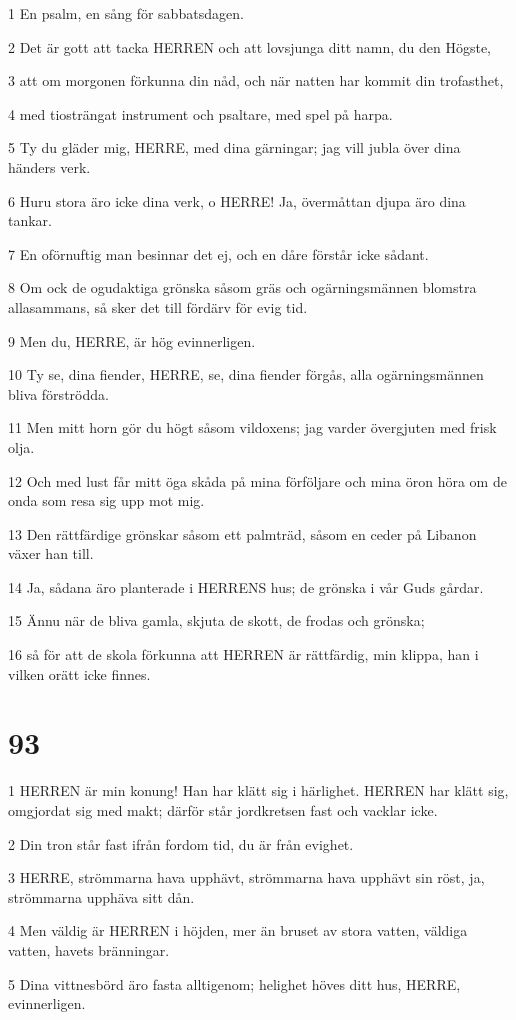 \par 1 En psalm, en sång för sabbatsdagen.
\par 2 Det är gott att tacka HERREN och att lovsjunga ditt namn, du den Högste,
\par 3 att om morgonen förkunna din nåd, och när natten har kommit din trofasthet,
\par 4 med tiosträngat instrument och psaltare, med spel på harpa.
\par 5 Ty du gläder mig, HERRE, med dina gärningar; jag vill jubla över dina händers verk.
\par 6 Huru stora äro icke dina verk, o HERRE! Ja, övermåttan djupa äro dina tankar.
\par 7 En oförnuftig man besinnar det ej, och en dåre förstår icke sådant.
\par 8 Om ock de ogudaktiga grönska såsom gräs och ogärningsmännen blomstra allasammans, så sker det till fördärv för evig tid.
\par 9 Men du, HERRE, är hög evinnerligen.
\par 10 Ty se, dina fiender, HERRE, se, dina fiender förgås, alla ogärningsmännen bliva förströdda.
\par 11 Men mitt horn gör du högt såsom vildoxens; jag varder övergjuten med frisk olja.
\par 12 Och med lust får mitt öga skåda på mina förföljare och mina öron höra om de onda som resa sig upp mot mig.
\par 13 Den rättfärdige grönskar såsom ett palmträd, såsom en ceder på Libanon växer han till.
\par 14 Ja, sådana äro planterade i HERRENS hus; de grönska i vår Guds gårdar.
\par 15 Ännu när de bliva gamla, skjuta de skott, de frodas och grönska;
\par 16 så för att de skola förkunna att HERREN är rättfärdig, min klippa, han i vilken orätt icke finnes.

\chapter{93}

\par 1 HERREN är min konung! Han har klätt sig i härlighet. HERREN har klätt sig, omgjordat sig med makt; därför står jordkretsen fast och vacklar icke.
\par 2 Din tron står fast ifrån fordom tid, du är från evighet.
\par 3 HERRE, strömmarna hava upphävt, strömmarna hava upphävt sin röst, ja, strömmarna upphäva sitt dån.
\par 4 Men väldig är HERREN i höjden, mer än bruset av stora vatten, väldiga vatten, havets bränningar.
\par 5 Dina vittnesbörd äro fasta alltigenom; helighet höves ditt hus, HERRE, evinnerligen.

